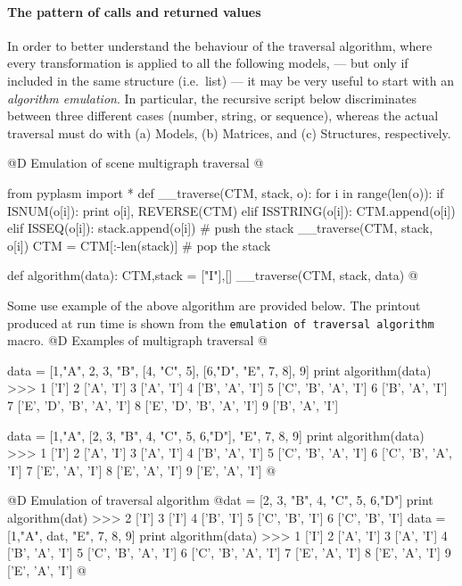 \documentclass[11pt,oneside]{article}    %
\begin{document}
\paragraph{The pattern of calls and returned values}

In order to better understand the behaviour of the traversal algorithm, where every transformation is applied to all the following models, --- but only if included in the same structure  (i.e.~list) --- it may be very useful to start with an \emph{algorithm emulation}. In particular, the recursive script below discriminates between three different cases (number, string, or sequence), whereas the actual traversal must do with (a) Models, (b) Matrices, and (c) Structures, respectively.

@D Emulation of scene multigraph traversal
@{from pyplasm import *
def __traverse(CTM, stack, o):
    for i in range(len(o)):
        if ISNUM(o[i]): print o[i], REVERSE(CTM)
        elif ISSTRING(o[i]): 
            CTM.append(o[i])
        elif ISSEQ(o[i]):
            stack.append(o[i])                # push the stack
            __traverse(CTM, stack, o[i])
            CTM = CTM[:-len(stack)]         # pop the stack

def algorithm(data):
    CTM,stack = ["I"],[]
    __traverse(CTM, stack, data)  
@}

Some use example of the above algorithm are provided below. The printout produced at run time is shown from the \texttt{emulation of traversal algorithm} macro.
@D Examples of multigraph traversal
@{data = [1,"A", 2, 3, "B", [4, "C", 5], [6,"D", "E", 7, 8], 9]  
print algorithm(data)
>>> 1 ['I']
    2 ['A', 'I']
    3 ['A', 'I']
    4 ['B', 'A', 'I']
    5 ['C', 'B', 'A', 'I']
    6 ['B', 'A', 'I']
    7 ['E', 'D', 'B', 'A', 'I']
    8 ['E', 'D', 'B', 'A', 'I']
    9 ['B', 'A', 'I']

data = [1,"A", [2, 3, "B", 4, "C", 5, 6,"D"], "E", 7, 8, 9]  
print algorithm(data)
>>> 1 ['I']
    2 ['A', 'I']
    3 ['A', 'I']
    4 ['B', 'A', 'I']
    5 ['C', 'B', 'A', 'I']
    6 ['C', 'B', 'A', 'I']
    7 ['E', 'A', 'I']
    8 ['E', 'A', 'I']
    9 ['E', 'A', 'I']
@}
@D Emulation of traversal algorithm
@{dat = [2, 3, "B", 4, "C", 5, 6,"D"]
print algorithm(dat)
>>> 2 ['I']
    3 ['I']
    4 ['B', 'I']
    5 ['C', 'B', 'I']
    6 ['C', 'B', 'I']
data = [1,"A", dat, "E", 7, 8, 9]
print algorithm(data)
>>> 1 ['I']
    2 ['A', 'I']
    3 ['A', 'I']
    4 ['B', 'A', 'I']
    5 ['C', 'B', 'A', 'I']
    6 ['C', 'B', 'A', 'I']
    7 ['E', 'A', 'I']
    8 ['E', 'A', 'I']
    9 ['E', 'A', 'I']
@}
\end{document}
